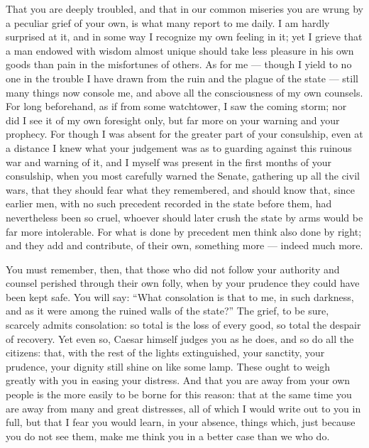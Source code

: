 

 That you are deeply troubled, and that in our common miseries you are wrung by a peculiar grief of your own, is what many report to me daily. I am hardly surprised at it, and in some way I recognize my own feeling in it; yet I grieve that a man endowed with wisdom almost unique should take less pleasure in his own goods than pain in the misfortunes of others. As for me --- though I yield to no one in the trouble I have drawn from the ruin and the plague of the state --- still many things now console me, and above all the consciousness of my own counsels. For long beforehand, as if from some watchtower, I saw the coming storm; nor did I see it of my own foresight only, but far more on your warning and your prophecy. For though I was absent for the greater part of your consulship, even at a distance I knew what your judgement was as to guarding against this ruinous war and warning of it, and I myself was present in the first months of your consulship, when you most carefully warned the Senate, gathering up all the civil wars, that they should fear what they remembered, and should know that, since earlier men, with no such precedent recorded in the state before them, had nevertheless been so cruel, whoever should later crush the state by arms would be far more intolerable. For what is done by precedent men think also done by right; and they add and contribute, of their own, something more --- indeed much more.

 You must remember, then, that those who did not follow your authority and counsel perished through their own folly, when by your prudence they could have been kept safe. You will say: ``What consolation is that to me, in such darkness, and as it were among the ruined walls of the state?'' The grief, to be sure, scarcely admits consolation: so total is the loss of every good, so total the despair of recovery. Yet even so, Caesar himself judges you as he does, and so do all the citizens: that, with the rest of the lights extinguished, your sanctity, your prudence, your dignity still shine on like some lamp. These ought to weigh greatly with you in easing your distress. And that you are away from your own people is the more easily to be borne for this reason: that at the same time you are away from many and great distresses, all of which I would write out to you in full, but that I fear you would learn, in your absence, things which, just because you do not see them, make me think you in a better case than we who do.

